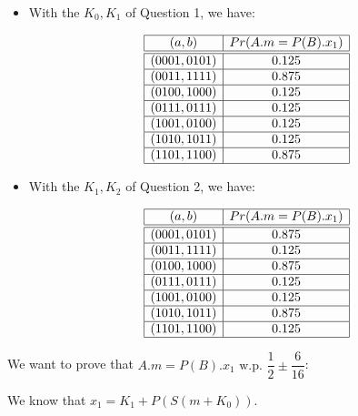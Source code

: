 \documentclass[a4paper]{article}
\begin{document}
\begin{itemize}

\item With the $K_0, K_1$ of Question 1, we have:

\begin{equation*}
\begin{array}{|c|c|}
\hline
(a,b) & Pr(A.m = P(B).x_1) \\
\hline
\hline
(0001,0101) & 0.125 \\
\hline
(0011,1111) & 0.875 \\
\hline
(0100,1000) & 0.125 \\
\hline
(0111,0111) & 0.125 \\
\hline
(1001,0100) & 0.125 \\
\hline
(1010,1011) & 0.125 \\
\hline
(1101,1100) & 0.875 \\
\hline
\end{array}
\end{equation*}

\item With the $K_1, K_2$ of Question 2, we have:

\begin{equation*}
\begin{array}{|c|c|}
\hline
(a,b) & Pr(A.m = P(B).x_1) \\
\hline
\hline
(0001,0101) & 0.875 \\
\hline
(0011,1111) & 0.125 \\
\hline
(0100,1000) & 0.875 \\
\hline
(0111,0111) & 0.125 \\
\hline
(1001,0100) & 0.125 \\
\hline
(1010,1011) & 0.875 \\
\hline
(1101,1100) & 0.125 \\
\hline
\end{array}
\end{equation*}

\end{itemize}

We want to prove that $A.m = P(B).x_1 \text{ w.p. } \dfrac{1}{2} \pm \dfrac{6}{16}$:

We know that $x_1 = K_1 + P(S(m + K_0))$.
\end{document}
